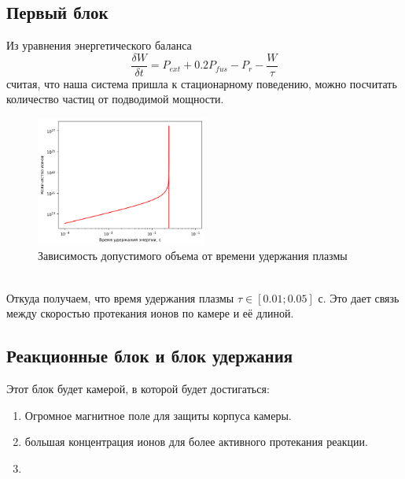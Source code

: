 \documentclass[a4paper,11pt]{article}
\begin{document}
\subsection{Первый блок}
Из уравнения энергетического баланса
\begin{equation}
	\frac{\delta W}{\delta t} = P_{ext} + 0.2P_{fus} - P_r - \frac{W}{\tau}
\end{equation}
считая, что наша система пришла к стационарному поведению, можно посчитать количество частиц от подводимой мощности.\\
\begin{figure}[h]
	\centering
	\includegraphics[width=0.5\textwidth]{"Graphs/Nbydt.png"}
	\caption{Зависимость допустимого объема от времени удержания плазмы}
\end{figure}\\
Откуда получаем, что время удержания плазмы $\tau \in [0.01; 0.05]$ с. Это дает связь между скоростью протекания ионов по камере и её длиной. 
\subsection{Реакционные блок и блок удержания}
Этот блок будет камерой, в которой будет достигаться:
\begin{enumerate}
	\item Огромное магнитное поле для защиты корпуса камеры. 
	\item большая концентрация ионов для более активного протекания реакции. 
	\item 
\end{enumerate} 
\end{document}
